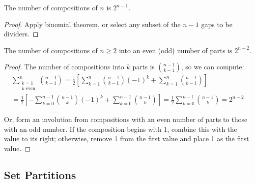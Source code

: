 \documentclass[a4paper]{article}
\begin{document}
\begin{theorem}
The number of compositions of $n$ is $2^{n-1}$.

\begin{hl}
\begin{proof}
Apply binomial theorem, or select any subset of the $n-1$ gaps to be dividers.
\end{proof}
\end{hl}
\end{theorem}

\begin{theorem}
The number of compositions of $n\geq2$ into an even (odd) number of parts is $2^{n-2}$.

\begin{hl}
\begin{proof}
The number of compositions into $k$ parts is $\binom{n-1}{k-1}$, so we can compute:
\begin{multline*}
\sum_{\substack{k=1\\k\text{ even}}}^n\binom{n-1}{k-1}
=\frac12\left[\sum_{k=1}^n\binom{n-1}{k-1}(-1)^k+\sum_{k=1}^n\binom{n-1}{k-1}\right]\\
=\frac12\left[-\sum_{k=0}^{n-1}\binom{n-1}{k}(-1)^k+\sum_{k=0}^{n-1}\binom{n-1}{k}\right]
=\frac12\sum_{k=0}^{n-1}\binom{n-1}k=2^{n-2}
\end{multline*}

Or, form an involution from compositions with an even number of parts to those with an odd number. If the composition begins with 1, combine this with the value to its right; otherwise, remove 1 from the first value and place 1 as the first value.
\end{proof}
\end{hl}
\end{theorem}

\subsection{Set Partitions}
\end{document}
